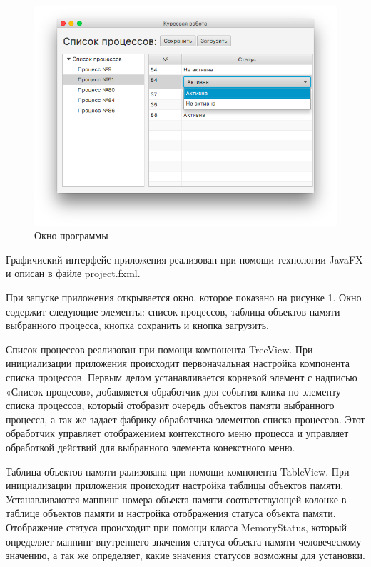 \documentclass[russian,utf8,simple,hpadding=10mm,vpadding=20mm]{eskdtext}
\begin{document}
\begin{figure}[!h]
    \centering
    \includegraphics[width=1\textwidth]{screenshots/1.png}
    \caption{Окно программы}
    \label{fig:mesh1}
\end{figure}

Графичиский интерфейс приложения реализован при помощи технологии JavaFX и описан в файле project.fxml.
 
При запуске приложения открывается окно, которое показано на рисунке 1. Окно содержит следующие элементы: список процессов, таблица объектов памяти выбранного процесса, кнопка сохранить и кнопка загрузить. 

Список процессов реализован при помощи компонента TreeView. При инициализации приложения происходит первоначальная настройка компонента списка процессов. Первым делом устанавливается корневой элемент с надписью «Список процесов», добавляется обработчик для события клика по элементу списка процессов, который отобразит очередь объектов памяти выбранного процесса, а так же задает фабрику обработчика элементов списка процессов. Этот обработчик управляет отображением контекстного меню процесса и управляет обработкой действий для выбранного элемента конекстного меню.

Таблица объектов памяти рализована при помощи компонента TableView. При инициализации приложения происходит настройка таблицы объектов памяти. Устанавливаются маппинг номера объекта памяти соответствующей колонке в таблице объектов памяти и настройка отображения статуса объекта памяти. Отображение статуса происходит при помощи класса MemoryStatus, который определяет маппинг внутреннего значения статуса объекта памяти человеческому значению, а так же определяет, какие значения статусов возможны для установки.
\end{document}
